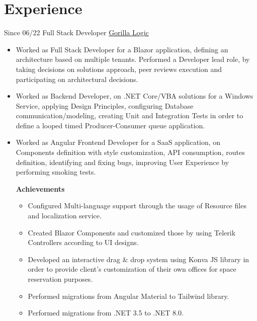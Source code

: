 \documentclass[letterpaper]{twentysecondcv} %
\begin{document}
\section{Experience}
    \begin{twenty}
        \twentyitem
        {Since 06/22}
        {Full Stack Developer}
        { \href{https://gorillalogic.com/}{Gorilla Logic} }
        {
            \begin{itemize}
                \item Worked as Full Stack Developer for a Blazor application, defining an architecture based on multiple tenants. Performed a Developer lead role, by taking decisions on solutions approach, peer reviews execution and participating on architectural decisions.

                \item Worked as Backend Developer, on .NET Core/VBA solutions for a Windows Service, applying Design Principles, configuring Database communication/modeling, creating Unit and Integration Tests in order to define a looped timed Producer-Consumer queue application.
                    
                \item Worked as Angular Frontend Developer for a SaaS application, on Components definition with style customization, API consumption, routes definition, identifying and fixing bugs, improving User Experience by performing smoking tests.

                \textbf{Achievements}
                \begin{itemize}
                    \item Configured Multi-language support through the usage of Resource files and localization service.
                
                    \item Created Blazor Components and customized those by using Telerik Controllers according to UI designs.
                
                    \item Developed an interactive drag \& drop system using Konva JS library in order to provide client's customization of their own offices for space reservation purposes.

                    \item Performed migrations from Angular Material to Tailwind library.

                    \item Performed migrations from .NET 3.5 to .NET 8.0.
                \end{itemize}
            

\end{itemize}}
\end{twenty}
\end{document}
